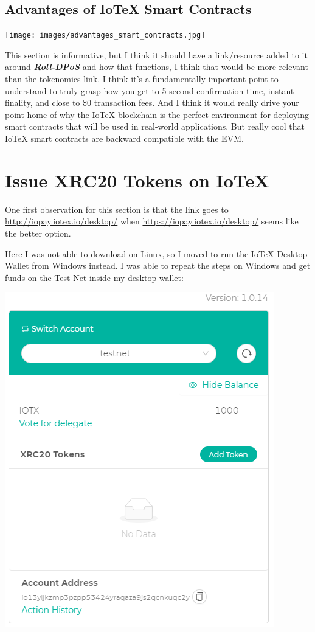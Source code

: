 \documentclass[
]{book}
\begin{document}
\hypertarget{advantages-of-iotex-smart-contracts}{%
\subsection{Advantages of IoTeX Smart
Contracts}\label{advantages-of-iotex-smart-contracts}}

\texttt{[image: images/advantages\_smart\_contracts.jpg]}

This section is informative, but I think it should have a link/resource
added to it around \textbf{\emph{Roll-DPoS}} and how that functions, I
think that would be more relevant than the tokenomics link. I think it's
a fundamentally important point to understand to truly grasp how you get
to 5-second confirmation time, instant finality, and close to \$0
transaction fees. And I think it would really drive your point home of
why the IoTeX blockchain is the perfect environment for deploying smart
contracts that will be used in real-world applications. But really cool
that IoTeX smart contracts are backward compatible with the EVM.

\hypertarget{issue-xrc20-tokens-on-iotex}{%
\section{Issue XRC20 Tokens on
IoTeX}\label{issue-xrc20-tokens-on-iotex}}

One first observation for this section is that the link goes to
\url{http://iopay.iotex.io/desktop/} when
\url{https://iopay.iotex.io/desktop/} seems like the better option.

Here I was not able to download on Linux, so I moved to run the IoTeX
Desktop Wallet from Windows instead. I was able to repeat the steps on
Windows and get funds on the Test Net inside my desktop wallet:

\includegraphics{images/desktop_funds.PNG}
\end{document}
